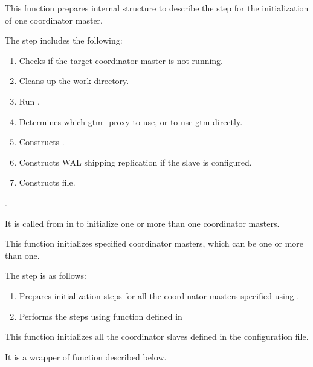   
      This function prepares internal  structure to describe the step for the initialization
      of one coordinator master.
      
      The step includes the following:
      
      \begin{enumerate}
		  \item Checks if the target coordinator master is not running.
		  \item Cleans up the work directory.
		  \item Run .
		  \item Determines which gtm\_proxy to use, or to use gtm directly.
		  \item Constructs .
		  \item Constructs WAL shipping replication if the slave is configured.
		  \item Constructs  file.
      \end{enumerate}.
      
      It is called from  in 
      to initialize one or more than one coordinator masters.
  
  
      This function initializes specified coordinator masters, which can be one or more than one.
      
      The step is as follows:
      
      \begin{enumerate}
		  \item Prepares initialization steps for all the coordinator masters specified using
				.
		  \item Performs the steps using  function defined in 
      \end{enumerate}
  
  
      This function initializes all the coordinator slaves defined in the configuration file.
      
      It is a wrapper of  function described below.
      
